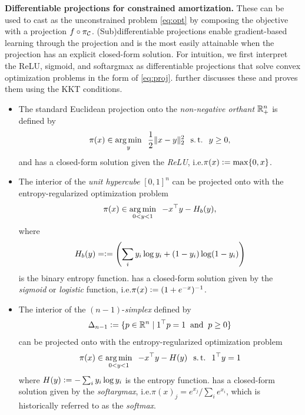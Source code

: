 \documentclass[twoside,11pt]{article}
\newcommand{\ie}{i.e.\xspace}
\begin{document}
\textbf{Differentiable projections for constrained amortization.}
These can be used to cast  as the unconstrained
problem \cref{eq:opt} by composing the objective with a projection
$f\circ \pi_{\mathcal{C}}$.
(Sub)differentiable projections enable gradient-based learning through the projection
and is the most easily attainable when the projection has an explicit closed-form solution.
For intuition, we first interpret the ReLU, sigmoid, and softargmax as
differentiable projections that solve convex optimization problems
in the form of \cref{eq:proj}.
\citet[\S2.4.4]{amos2019differentiable} further discusses these
and proves them using the KKT conditions.

\begin{itemize}
\item The standard Euclidean projection onto the
  \emph{non-negative orthant} $\mathbb{R}^n_+$ is defined by
  \begin{equation}
    \pi(x) \in \operatorname*{arg\,min}_y \;\; \frac{1}{2}\|x-y\|_2^2 \;\; \operatorname*{s.t.} \;\; y\geq 0,
    \label{eq:relu-proj}
  \end{equation}
  and has a closed-form solution given the
  \emph{ReLU}, \ie $\pi(x) \vcentcolon= \max\{0, x\}$.
\item The interior of the \emph{unit hypercube} $[0,1]^n$ can
  be projected onto with the entropy-regularized
  optimization problem
  \begin{equation}
    \pi(x) \in \operatorname*{arg\,min}_{0<y<1} \;\; -x^\top y -H_b(y),
    \label{eq:sigmoid-proj}
  \end{equation}
  where
  \begin{equation}
  H_b(y) = \vcentcolon= \left(\sum_i y_i\log y_i + (1-y_i)\log (1-y_i)\right)
  \end{equation}
  is the
  binary entropy function.
   has a closed-form solution given by
  the \emph{sigmoid} or \emph{logistic} function,
  \ie $\pi(x) \vcentcolon= (1+e^{-x})^{-1}$.
\item The interior of the $(n-1)$-\emph{simplex} defined by
  \begin{equation}
    \Delta_{n-1}\vcentcolon=\{p\in\mathbb{R}^n\; \vert\; 1^\top p = 1 \; \; {\rm and} \;\; p \geq 0 \}
    \label{eq:simplex}
  \end{equation}
  can be projected onto with the entropy-regularized
  optimization problem
  \begin{equation}
    \pi(x) \in \operatorname*{arg\,min}_{0<y<1} \;\; -x^\top y - H(y) \;\; \operatorname*{s.t.}\;\; 1^\top y = 1
    \label{eq:simplex-proj}
  \end{equation}
  where $H(y) \vcentcolon= -\sum_i y_i \log y_i$ is the entropy function.
   has a closed-form solution given by
  the \emph{softargmax}, \ie $\pi(x)_j = e^{x_j} / \sum_i e^{x_i}$,
  which is historically referred to as the \emph{softmax}.
\end{itemize}
\end{document}
